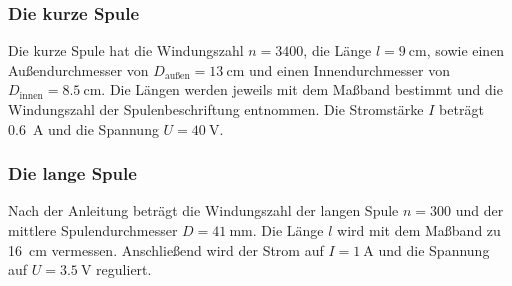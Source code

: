 \subsubsection{Die kurze Spule}
Die kurze Spule hat die Windungszahl $n = 3400$, die Länge $l = \qty[]{9}{\cm}$, sowie einen Außendurchmesser von 
$D_\text{außen} = \qty[]{13}{\cm}$ und einen Innendurchmesser von $D_\text{innen} = \qty[]{8.5}{\cm}$.
Die Längen werden jeweils mit dem Maßband bestimmt und die Windungszahl der Spulenbeschriftung entnommen.
Die Stromstärke $I$ beträgt \qty[]{0.6}{\ampere} und die Spannung $U = \qty[]{40}{\volt}$.


\subsubsection{Die lange Spule}
Nach der Anleitung \cite[]{man:v308} beträgt die Windungszahl der langen Spule $n = 300$ und der mittlere Spulendurchmesser $D = \qty[]{41}{\mm}$.
Die Länge $l$ wird mit dem Maßband zu \qty[]{16}{cm} vermessen.
Anschließend wird der Strom auf $I = \qty[]{1}{\ampere}$ und die Spannung auf $U = \qty[]{3.5}{\volt}$ reguliert.
